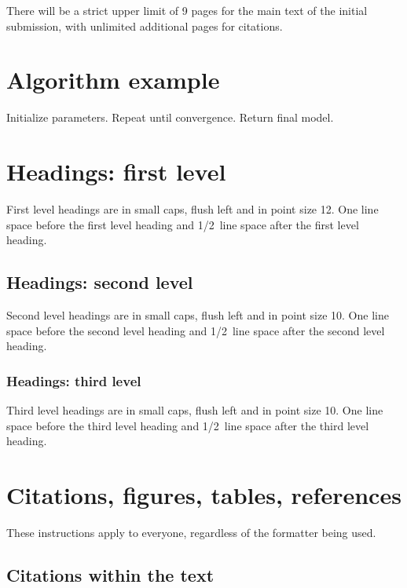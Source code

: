 \documentclass{article} %
\begin{document}
There will be a strict upper limit of 9 pages for the main text of the initial submission, with unlimited additional pages for citations.

\section{Algorithm example}
\begin{algorithm}
\caption{Example pseudocode block.}
\begin{algorithmic}
\STATE Initialize parameters.
\STATE Repeat until convergence.
\STATE Return final model.
\end{algorithmic}
\end{algorithm}

\section{Headings: first level}
\label{headings}

First level headings are in small caps,
flush left and in point size 12. One line space before the first level
heading and 1/2~line space after the first level heading.

\subsection{Headings: second level}

Second level headings are in small caps,
flush left and in point size 10. One line space before the second level
heading and 1/2~line space after the second level heading.

\subsubsection{Headings: third level}

Third level headings are in small caps,
flush left and in point size 10. One line space before the third level
heading and 1/2~line space after the third level heading.

\section{Citations, figures, tables, references}
\label{others}

These instructions apply to everyone, regardless of the formatter being used.

\subsection{Citations within the text}
\end{document}
